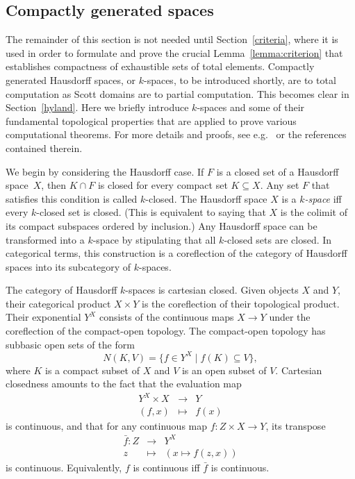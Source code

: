 \documentclass{LMCS}
\begin{document}
\subsection{Compactly generated spaces} \label{compactly}

The remainder of this section is not needed until
Section~\ref{criteria}, where it is used in order to formulate and
prove the crucial Lemma~\ref{lemma:criterion} that establishes
compactness of exhaustible sets of total elements.  Compactly
generated Hausdorff spaces, or $k$-spaces, to be introduced shortly,
are to total computation as Scott domains are to partial computation.
This becomes clear in Section~\ref{hyland}. Here we briefly introduce
$k$-spaces and some of their fundamental topological properties that
are applied to prove various computational theorems. For more details
and proofs, see e.g.~\cite{escardo:lawson:simpson} or the references
contained therein.

We begin by considering the Hausdorff case. If $F$ is a closed set of a
Hausdorff space~$X$, then $K \cap F$ is closed for every compact set
$K \subseteq X$.  Any set $F$ that satisfies this condition is called
$k$-closed. The Hausdorff space $X$ is a \emph{$k$-space} iff every
$k$-closed set is closed. (This is equivalent to saying that $X$ is
the colimit of its compact subspaces ordered by inclusion.) Any
Hausdorff space can be transformed into a $k$-space by stipulating
that all $k$-closed sets are closed.  In categorical terms, this
construction is a coreflection of the category of Hausdorff spaces
into its subcategory of $k$-spaces. 


The category of Hausdorff $k$-spaces is cartesian closed. Given
objects $X$ and $Y$, their categorical product $X \times Y$ is the
coreflection of their topological product. Their exponential $Y^X$
consists of the continuous maps $X \to Y$ under the coreflection of
the compact-open topology.  The compact-open topology has subbasic
open sets of the form \[N(K,V) = \{ f \in Y^X \mid f(K) \subseteq
V\},\] where $K$ is a compact subset of $X$ and $V$ is an open subset
of $V$.  Cartesian closedness amounts to the fact that the evaluation
map
\begin{eqnarray*}
  Y^X \times X  & \to & Y \\
  (f,x) & \mapsto & f(x)
\end{eqnarray*}
is continuous, and that for any continuous map $f \colon Z \times X \to Y$,
its transpose
\begin{eqnarray*}
  \bar{f} \colon Z & \to&  Y^X \\
  z & \mapsto & (x \mapsto f(z,x))
\end{eqnarray*}
is continuous. Equivalently, $f$ is continuous iff $\bar{f}$ is
continuous.
\end{document}
